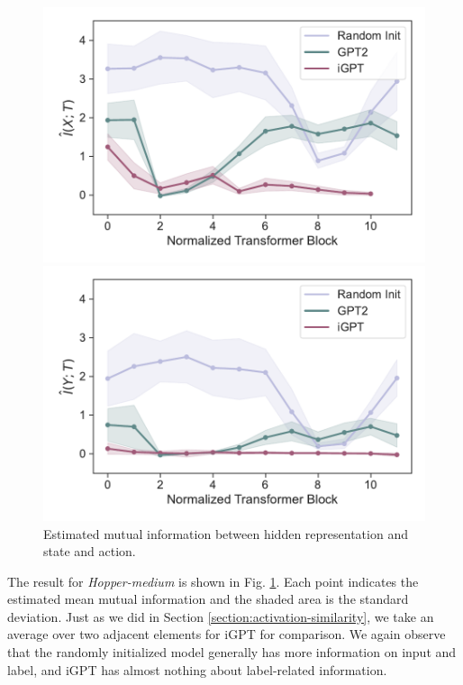 \documentclass{article}
\begin{document}
\begin{figure}[H]
    \centering
    \begin{minipage}[b]{0.45\linewidth}
    \includegraphics[width=\linewidth]{figs/mi_state_40_gpt2_igpt_dt_hopper_medium_666.pdf}
    \end{minipage}
    \begin{minipage}[b]{0.45\linewidth}
    \includegraphics[width=\linewidth]{figs/mi_action_40_gpt2_igpt_dt_hopper_medium_666.pdf}
    \end{minipage}
    \caption{Estimated mutual information between hidden representation and state and action.}
    \label{fig:mutual_information_no_context}
\end{figure}

The result for \textit{Hopper-medium} is shown in Fig. \ref{fig:mutual_information_no_context}. Each point indicates the estimated mean mutual information and the shaded area is the standard deviation. Just as we did in Section \ref{section:activation-similarity}, we take an average over two adjacent elements for iGPT for comparison. We again observe that the randomly initialized model generally has more information on input and label, and iGPT has almost nothing about label-related information.
\end{document}
